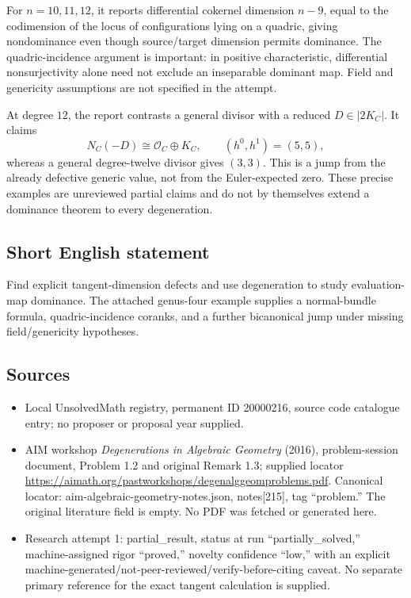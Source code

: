 \documentclass[11pt]{article}
\begin{document}
For $n=10,11,12$, it reports differential cokernel dimension $n-9$, equal to the codimension of the locus of configurations lying on a quadric, giving nondominance even though source/target dimension permits dominance. The quadric-incidence argument is important: in positive characteristic, differential nonsurjectivity alone need not exclude an inseparable dominant map. Field and genericity assumptions are not specified in the attempt.

At degree $12$, the report contrasts a general divisor with a reduced $D\in|2K_C|$. It claims
\[
 N_C(-D)\cong\mathcal O_C\oplus K_C,
 \qquad(h^0,h^1)=(5,5),
\]
whereas a general degree-twelve divisor gives $(3,3)$. This is a jump from the already defective generic value, not from the Euler-expected zero. These precise examples are unreviewed partial claims and do not by themselves extend a dominance theorem to every degeneration.
\subsection{Short English statement}
Find explicit tangent-dimension defects and use degeneration to study evaluation-map dominance. The attached genus-four example supplies a normal-bundle formula, quadric-incidence coranks, and a further bicanonical jump under missing field/genericity hypotheses.
\subsection{Sources}
\begin{itemize}
\item Local UnsolvedMath registry, permanent ID 20000216, source code catalogue entry; no proposer or proposal year supplied.
\item AIM workshop \emph{Degenerations in Algebraic Geometry} (2016), problem-session document, Problem 1.2 and original Remark 1.3; supplied locator \url{https://aimath.org/pastworkshops/degenalggeomproblems.pdf}. Canonical locator: aim-algebraic-geometry-notes.json, notes[215], tag ``problem.'' The original literature field is empty. No PDF was fetched or generated here.
\item Research attempt 1: partial\_result, status at run ``partially\_solved,'' machine-assigned rigor ``proved,'' novelty confidence ``low,'' with an explicit machine-generated/not-peer-reviewed/verify-before-citing caveat. No separate primary reference for the exact tangent calculation is supplied.
\end{itemize}
\end{document}
